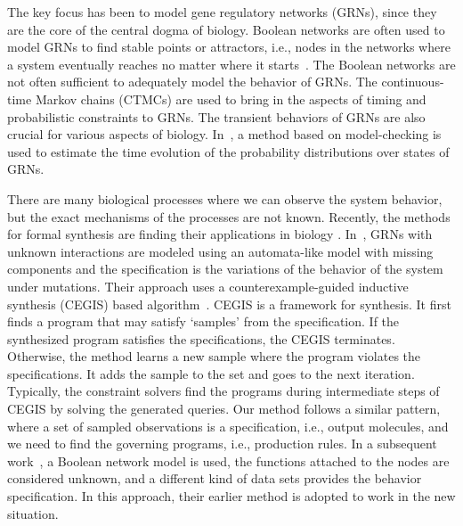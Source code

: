 The key focus has been to model gene regulatory networks (GRNs), since
they are the core of the central dogma of biology.
Boolean networks are often used to model
GRNs to find stable points or attractors, i.e., nodes in the networks
where a system eventually reaches no matter where it starts~\cite{wang2012BooleanOverview}.
The Boolean networks are not often sufficient to adequately model the behavior
of GRNs.
The continuous-time Markov chains (CTMCs) are used to bring in the aspects of
timing and probabilistic constraints to GRNs.
The transient behaviors of GRNs are also crucial for various aspects
of biology.
In~\cite{delayedCTMC}, a method based on
model-checking is used to estimate the time evolution of the probability
distributions over states of GRNs.


There are many biological processes where we can observe the system behavior,
but the exact mechanisms of the processes are not known.
%
Recently, the methods for formal synthesis are finding their applications in biology
\cite{dunn2014defining,xuPluripotency,booleanModelKarp13,paoletti2014analyzing}.
%
In~\cite{koksal2013synthesis},
GRNs with unknown interactions are modeled using
an automata-like model with missing components
and the specification is the variations of the behavior of the system under mutations.
Their approach uses a counterexample-guided inductive synthesis (CEGIS) based algorithm~\cite{cegis}.
CEGIS is a framework for synthesis. It first finds a program that may satisfy `samples' from
the specification. If the synthesized program satisfies the specifications, the CEGIS terminates.
Otherwise, the method learns a new sample where the program violates the specifications.
It adds the sample to the set and goes to the next iteration.
Typically, the constraint solvers find the programs during intermediate steps of CEGIS by
solving the generated queries.
%
Our method follows a similar pattern, where
a set of sampled observations is a specification, i.e., output molecules,
and we need to find the governing programs, i.e., production rules.
%
In a subsequent work~\cite{fisher2015synthesising}, a Boolean network model is used,
the functions attached to the nodes are considered unknown, and
a different kind of data sets provides the behavior specification.
In this approach, their earlier method is adopted to work in the new situation.
%

